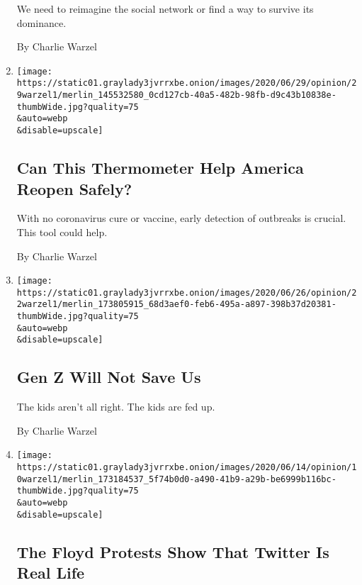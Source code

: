 \begin{enumerate}
  We need to reimagine the social network or find a way to survive its
  dominance.

  By Charlie Warzel
\item
  \href{/2020/06/29/opinion/coronavirus-kinsa-thermometer.html}{}

  \texttt{[image: https://static01.graylady3jvrrxbe.onion/images/2020/06/29/opinion/29warzel1/merlin\_145532580\_0cd127cb-40a5-482b-98fb-d9c43b10838e-thumbWide.jpg?quality=75\\\&auto=webp\\\&disable=upscale]}

  \hypertarget{can-this-thermometer-help-america-reopen-safely}{%
  \subsection{Can This Thermometer Help America Reopen
  Safely?}\label{can-this-thermometer-help-america-reopen-safely}}

  With no coronavirus cure or vaccine, early detection of outbreaks is
  crucial. This tool could help.

  By Charlie Warzel
\item
  \href{/2020/06/22/opinion/trump-protest-gen-z.html}{}

  \texttt{[image: https://static01.graylady3jvrrxbe.onion/images/2020/06/26/opinion/22warzel1/merlin\_173805915\_68d3aef0-feb6-495a-a897-398b37d20381-thumbWide.jpg?quality=75\\\&auto=webp\\\&disable=upscale]}

  \hypertarget{gen-z-will-not-save-us}{%
  \subsection{Gen Z Will Not Save Us}\label{gen-z-will-not-save-us}}

  The kids aren't all right. The kids are fed up.

  By Charlie Warzel
\item
  \href{/2020/06/10/opinion/sunday/twitter-protest-politics.html}{}

  \texttt{[image: https://static01.graylady3jvrrxbe.onion/images/2020/06/14/opinion/10warzel1/merlin\_173184537\_5f74b0d0-a490-41b9-a29b-be6999b116bc-thumbWide.jpg?quality=75\\\&auto=webp\\\&disable=upscale]}

  \hypertarget{the-floyd-protests-show-that-twitter-is-real-life}{%
  \subsection{The Floyd Protests Show That Twitter Is Real
  Life}\label{the-floyd-protests-show-that-twitter-is-real-life}}


\end{enumerate}
